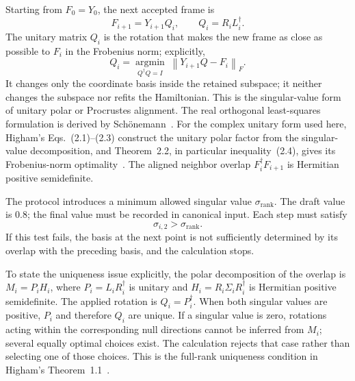 \documentclass[11pt]{article}
\newcommand{\norm}[1]{\left\lVert #1\right\rVert}
\begin{document}
Starting from $F_0=Y_0$, the next accepted frame is
\begin{equation}
 F_{i+1}=Y_{i+1}Q_i,
 \qquad
 Q_i=R_iL_i^\dagger.
 \label{eq:parallel-transport}
\end{equation}
The unitary matrix $Q_i$ is the rotation that makes the new frame as close as possible
to $F_i$ in the Frobenius norm; explicitly,
\begin{equation}
 Q_i=\underset{Q^\dagger Q=I}{\operatorname{argmin}}
 \;\norm{Y_{i+1}Q-F_i}_F.
 \label{eq:neighbor-procrustes-objective}
\end{equation}
It changes only the coordinate basis inside the retained subspace; it neither changes the
subspace nor refits the Hamiltonian. This is the singular-value form of unitary polar or
Procrustes alignment. The real orthogonal least-squares formulation is derived by
Sch\"onemann~\cite{schonemann1966}. For the complex unitary form used here, Higham's
Eqs.~(2.1)--(2.3) construct the unitary polar factor from the singular-value
decomposition, and Theorem~2.2, in particular inequality~(2.4), gives its
Frobenius-norm optimality~\cite{higham1986}. The aligned neighbor overlap
$F_i^\dagger F_{i+1}$ is Hermitian positive semidefinite.

The protocol introduces a minimum allowed singular value $\sigma_{\mathrm{rank}}$. The
draft value is $0.8$; the final value must be recorded in canonical input. Each step must
satisfy
\begin{equation}
 \sigma_{i,2}>\sigma_{\mathrm{rank}}.
 \label{eq:overlap-rank-test}
\end{equation}
If this test fails, the basis at the next point is not sufficiently determined by its
overlap with the preceding basis, and the calculation stops.

To state the uniqueness issue explicitly, the polar decomposition of the overlap is
$M_i=P_iH_i$, where $P_i=L_iR_i^\dagger$ is unitary and
$H_i=R_i\Sigma_iR_i^\dagger$ is Hermitian positive semidefinite. The applied rotation is
$Q_i=P_i^\dagger$. When both singular values are positive, $P_i$ and therefore $Q_i$ are
unique. If a singular value is zero, rotations acting within the corresponding null
directions cannot be inferred from $M_i$; several equally optimal choices exist. The
calculation rejects that case rather than selecting one of those choices. This is the
full-rank uniqueness condition in Higham's Theorem~1.1~\cite{higham1986}.
\end{document}
